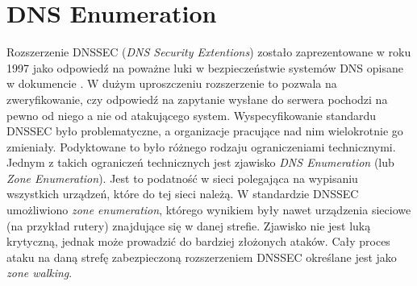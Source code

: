 \section{DNS Enumeration}\label{zone_enumeration}
Rozszerzenie DNSSEC (\textit{DNS Security Extentions}) zostało zaprezentowane w roku 1997 \cite{RFC2065} jako odpowiedź na poważne
luki w bezpieczeństwie systemów DNS opisane w dokumencie \cite{DNSsecurityProblem}. W dużym uproszczeniu rozszerzenie to pozwala
na zweryfikowanie, czy odpowiedź na zapytanie wysłane do serwera pochodzi na pewno od niego a nie od atakującego system.
Wyspecyfikowanie standardu DNSSEC było problematyczne, a organizacje pracujące nad nim wielokrotnie go zmieniały. Podyktowane to
było różnego rodzaju ograniczeniami technicznymi. Jednym z takich ograniczeń technicznych jest zjawisko \textit{DNS Enumeration}
(lub \textit{Zone Enumeration}). Jest to podatność w sieci polegająca na wypisaniu wszystkich urządzeń, które do tej sieci należą.
W standardzie DNSSEC umożliwiono \textit{zone enumeration}, którego wynikiem były nawet urządzenia sieciowe (na przykład rutery)
znajdujące się w danej strefie. Zjawisko nie jest luką krytyczną, jednak może prowadzić do bardziej złożonych ataków. Cały
proces ataku na daną strefę zabezpieczoną rozszerzeniem DNSSEC określane jest jako \textit{zone walking}.


